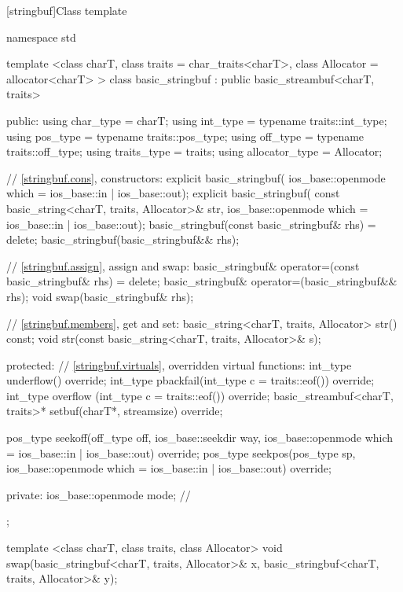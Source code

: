 [stringbuf]{Class template }
%
\begin{codeblock}
namespace std {
  template <class charT, class traits = char_traits<charT>,
            class Allocator = allocator<charT> >
  class basic_stringbuf
    : public basic_streambuf<charT, traits> {
  public:
    using char_type      = charT;
    using int_type       = typename traits::int_type;
    using pos_type       = typename traits::pos_type;
    using off_type       = typename traits::off_type;
    using traits_type    = traits;
    using allocator_type = Allocator;

    // \ref{stringbuf.cons}, constructors:
    explicit basic_stringbuf(
      ios_base::openmode which = ios_base::in | ios_base::out);
    explicit basic_stringbuf(
      const basic_string<charT, traits, Allocator>& str,
      ios_base::openmode which = ios_base::in | ios_base::out);
    basic_stringbuf(const basic_stringbuf& rhs) = delete;
    basic_stringbuf(basic_stringbuf&& rhs);

    // \ref{stringbuf.assign}, assign and swap:
    basic_stringbuf& operator=(const basic_stringbuf& rhs) = delete;
    basic_stringbuf& operator=(basic_stringbuf&& rhs);
    void swap(basic_stringbuf& rhs);

    // \ref{stringbuf.members}, get and set:
    basic_string<charT, traits, Allocator> str() const;
    void str(const basic_string<charT, traits, Allocator>& s);

  protected:
    // \ref{stringbuf.virtuals}, overridden virtual functions:
    int_type underflow() override;
    int_type pbackfail(int_type c = traits::eof()) override;
    int_type overflow (int_type c = traits::eof()) override;
    basic_streambuf<charT, traits>* setbuf(charT*, streamsize) override;

    pos_type seekoff(off_type off, ios_base::seekdir way,
                     ios_base::openmode which
                      = ios_base::in | ios_base::out) override;
    pos_type seekpos(pos_type sp,
                     ios_base::openmode which
                      = ios_base::in | ios_base::out) override;

  private:
    ios_base::openmode mode;  // \expos
  };

  template <class charT, class traits, class Allocator>
    void swap(basic_stringbuf<charT, traits, Allocator>& x,
              basic_stringbuf<charT, traits, Allocator>& y);
}
\end{codeblock}

